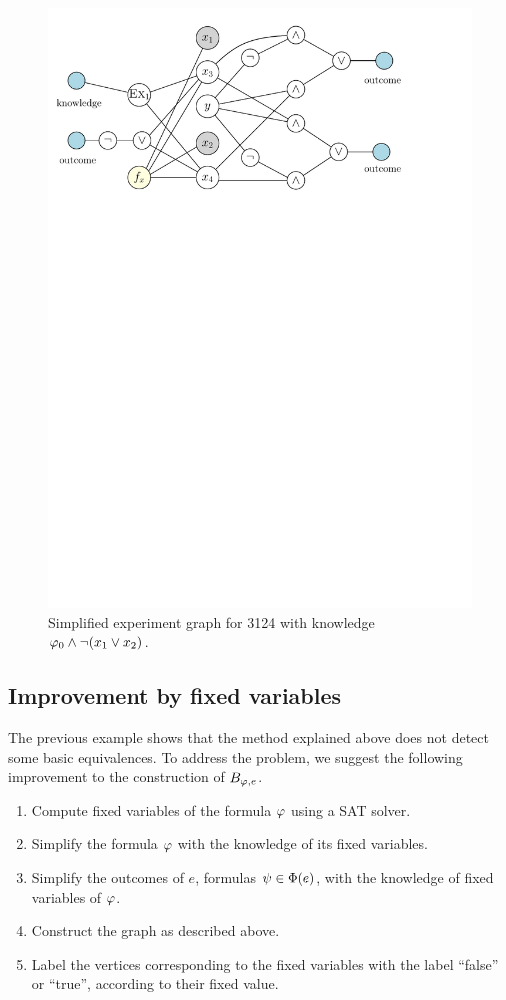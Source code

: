 \begin{example}
\begin{figure}[t]
\begin{center}
\includegraphics[width=.7\textwidth]{pictures/exp-graph-sim.pdf}
\caption{Simplified experiment graph for 3124 with knowledge $\varphi_0\wedge\neg(x_1\vee x_2)$.}
\label{fig:exp-graph-sim}
\end{center}
\end{figure}
\end{example}
\subsection{Improvement by fixed variables}

The previous example shows that the method explained above
  does not detect some basic equivalences.
To address the problem, we suggest the following improvement to the construction
  of $B_{\varphi, e}$.
\begin{enumerate} \itemsep 2pt
\item Compute fixed variables of the formula $\varphi$ using a SAT solver.
\item Simplify the formula $\varphi$ with the knowledge of its fixed variables.
\item Simplify the outcomes of $e$, formulas $\psi\in\Phi(e)$, with
  the knowledge of fixed variables of $\varphi$.
\item Construct the graph as described above.
\item Label the vertices corresponding to the fixed variables with the label ``false'' or ``true'',
  according to their fixed value.
\end{enumerate}

